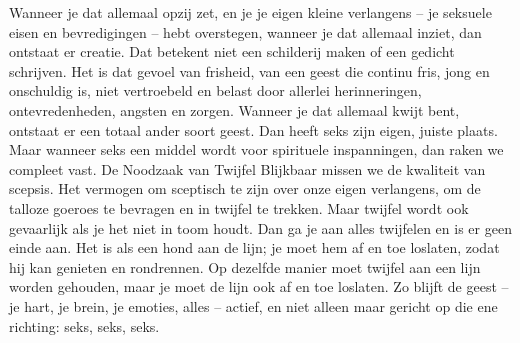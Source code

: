 Wanneer je dat allemaal opzij zet, en je je eigen kleine verlangens – je seksuele eisen en bevredigingen – hebt overstegen, wanneer je dat allemaal inziet, dan ontstaat er creatie. Dat betekent niet een schilderij maken of een gedicht schrijven. Het is dat gevoel van frisheid, van een geest die continu fris, jong en onschuldig is, niet vertroebeld en belast door allerlei herinneringen, ontevredenheden, angsten en zorgen.
Wanneer je dat allemaal kwijt bent, ontstaat er een totaal ander soort geest. Dan heeft seks zijn eigen, juiste plaats. Maar wanneer seks een middel wordt voor spirituele inspanningen, dan raken we compleet vast.
De Noodzaak van Twijfel
Blijkbaar missen we de kwaliteit van scepsis. Het vermogen om sceptisch te zijn over onze eigen verlangens, om de talloze goeroes te bevragen en in twijfel te trekken. Maar twijfel wordt ook gevaarlijk als je het niet in toom houdt. Dan ga je aan alles twijfelen en is er geen einde aan. Het is als een hond aan de lijn; je moet hem af en toe loslaten, zodat hij kan genieten en rondrennen. Op dezelfde manier moet twijfel aan een lijn worden gehouden, maar je moet de lijn ook af en toe loslaten. Zo blijft de geest – je hart, je brein, je emoties, alles – actief, en niet alleen maar gericht op die ene richting: seks, seks, seks.
